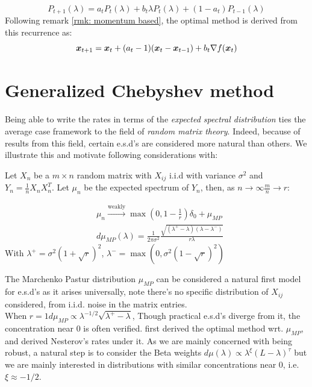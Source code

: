 \documentclass{article}
\begin{document}
\begin{equation}
    P_{t+1}(\lambda)=a_tP_t(\lambda)+b_t\lambda P_t(\lambda)+(1-a_t)P_{t-1}(\lambda)
\end{equation}
Following remark \ref{rmk: momentum based}, the optimal method is derived from this recurrence as:
\begin{equation}
    {\boldsymbol x}_{t+1}={\boldsymbol x}_t+(a_t-1)({\boldsymbol x}_t-{\boldsymbol x}_{t-1})+b_t\nabla f({\boldsymbol x}_t)
\end{equation}



\section{Generalized Chebyshev method}
Being able to write the rates in terms of the \textit{expected spectral distribution} ties the average case framework to the field of \textit{random matrix theory}. Indeed, because of results from this field, certain e.s.d's are considered more natural than others. We illustrate this and motivate following considerations with:
\begin{prop}
Let $X_n$ be a $m\times n$ random matrix with $X_{ij}$ i.i.d with variance $\sigma^2$ and $Y_n=\frac{1}{n}X_nX_n^T$. Let $\mu_n$ be the expected spectrum of $Y_n$, then, as $n\rightarrow\infty$$\frac{m}{n} \rightarrow r$:

\begin{align*}
&\mu_n\xrightarrow{\text{weakly}}{}\max(0,1-\frac{1}{r})\delta_0+\mu_{MP} \\
&d\mu_{MP}(\lambda)=\frac{1}{2\pi\sigma^2}\frac{\sqrt{(\lambda^+-\lambda)(\lambda-\lambda^-)}}{r\lambda}
\end{align*}
With $\lambda^+=\sigma^2(1+\sqrt{r})^2$, $\lambda^-=\max(0,\sigma^2(1-\sqrt{r})^2)$

\end{prop}
The Marchenko Pastur distribution $\mu_{MP}$ can be considered a natural first model for e.s.d's as it arises universally, note there's no specific distribution of $X_{ij}$ considered, from i.i.d. noise in the matrix entries.\\
When $r=1 d\mu_{MP}\propto \lambda^{-1/2}\sqrt{\lambda^+-\lambda}$, Though practical e.s.d's diverge from it, the concentration near $0$ is often verified.
\cite{pedregosa2020acceleration} first derived the optimal method wrt. $\mu_{MP}$, and \cite{paquette2020halting} derived Nesterov's rates under it. As we are mainly concerned with being robust, a natural step is to consider the Beta weights $d\mu(\lambda)\propto\lambda^\xi(L-\lambda)^\tau$ but we are mainly interested in distributions with similar concentrations near $0$, i.e. $\xi\approx -1/2$.\\
\end{document}
